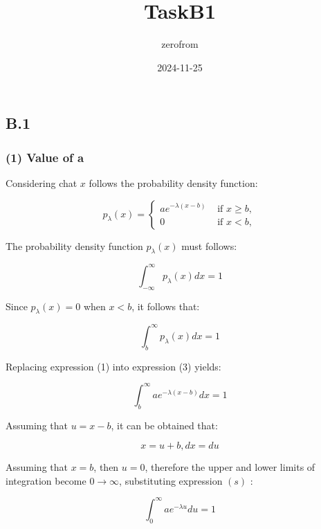 \documentclass[
]{article}
\title{TaskB1}
\author{zerofrom}
\date{2024-11-25}
\begin{document}
\maketitle

\subsection{B.1}\label{b.1}

\subsubsection{(1) Value of a}\label{value-of-a}

Considering chat \(x\) follows the probability density function:

\[
p_{\lambda}(x)= \begin{cases}a e^{-\lambda(x-b)} & \text { if } x \geqslant b,  \tag{1}\\ 0 & \text { if } x<b,\end{cases}
\]

The probability density function \(p_{\lambda}(x)\) must follows:

\[
\begin{equation*}
\int_{-\infty}^{\infty} p_{\lambda}(x) d x=1 \tag{2}
\end{equation*}
\]

Since \(p_{\lambda}(x)=0\) when \(x<b\), it follows that:

\[
\begin{equation*}
\int_{b}^{\infty} p_{\lambda}(x) d x=1 \tag{3}
\end{equation*}
\]

Replacing expression (1) into expression (3) yields:

\[
\begin{equation*}
\int_{b}^{\infty} a e^{-\lambda(x-b)} d x=1 \tag{4}
\end{equation*}
\]

Assuming that \(u=x-b\), it can be obtained that:

\[
\begin{equation*}
x=u+b, d x=d u \tag{5}
\end{equation*}
\]

Assuming that \(x=b\), then \(u=0\), therefore the upper and lower
limits of integration become \(0 \rightarrow \infty\), substituting
expression \((s)\) :

\[
\begin{equation*}
\int_{0}^{\infty} a e^{-\lambda u} d u=1 \tag{6}
\end{equation*}
\]
\end{document}
